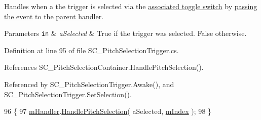 Handles when a the trigger is selected via the \hyperlink{group___s_c___p_s_t_priv_var_ga1ecd33f50c82f6ffda81850438907a31}{associated toggle switch} by \hyperlink{group___s_c___p_s_c_handlers_gaa2afa8167100515d412cf751d9334f0c}{passing the event} to the \hyperlink{group___doc_s_c___p_s_c}{parent handler}. 


\begin{DoxyParams}[1]{Parameters}
\mbox{\tt in}  & {\em a\+Selected} & True if the trigger was selected. False otherwise. \\
\hline
\end{DoxyParams}


Definition at line 95 of file S\+C\+\_\+\+Pitch\+Selection\+Trigger.\+cs.



References S\+C\+\_\+\+Pitch\+Selection\+Container.\+Handle\+Pitch\+Selection().



Referenced by S\+C\+\_\+\+Pitch\+Selection\+Trigger.\+Awake(), and S\+C\+\_\+\+Pitch\+Selection\+Trigger.\+Set\+Selection().


\begin{DoxyCode}
96     \{
97         \hyperlink{group___s_c___p_s_t_priv_var_ga23cf7134e224e9718a99949979cd5078}{mHandler}.\hyperlink{group___s_c___p_s_c_handlers_gaa2afa8167100515d412cf751d9334f0c}{HandlePitchSelection}( aSelected, 
      \hyperlink{group___s_c___p_s_t_priv_var_ga7d7771170c1f6cb1d6a9eb41e96a478f}{mIndex} );
98     \}
\end{DoxyCode}
